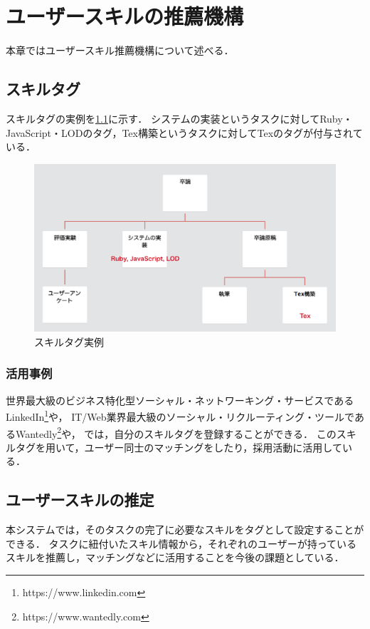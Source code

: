 \chapter{ユーザースキルの推薦機構}
本章ではユーザースキル推薦機構について述べる．

\section{スキルタグ}
スキルタグの実例を\ref{img:skill_tag}に示す．
システムの実装というタスクに対してRuby・JavaScript・LODのタグ，Tex構築というタスクに対してTexのタグが付与されている．

\begin{figure}[t]
	\begin{center}
		\includegraphics[width=0.9\linewidth]{assets/img/skill_tag.png}
		\caption{スキルタグ実例}
		\label{img:skill_tag}
	\end{center}
\end{figure}

\subsection{活用事例}
世界最大級のビジネス特化型ソーシャル・ネットワーキング・サービスであるLinkedIn\footnote{https://www.linkedin.com}や，
IT/Web業界最大級のソーシャル・リクルーティング・ツールであるWantedly\footnote{https://www.wantedly.com}や，
では，自分のスキルタグを登録することができる．
このスキルタグを用いて，ユーザー同士のマッチングをしたり，採用活動に活用している．

\section{ユーザースキルの推定}
本システムでは，そのタスクの完了に必要なスキルをタグとして設定することができる．
タスクに紐付いたスキル情報から，それぞれのユーザーが持っているスキルを推薦し，マッチングなどに活用することを今後の課題としている．

